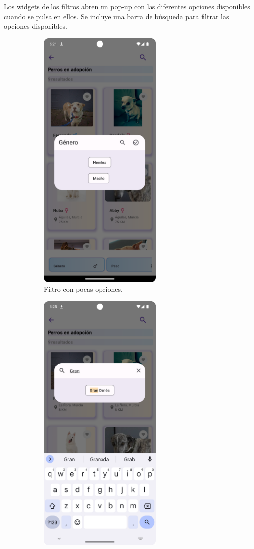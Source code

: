 \documentclass[a4paper, 12pt]{article}
\begin{document}
Los widgets de los filtros abren un pop-up con las diferentes opciones disponibles cuando se pulsa en ellos. Se incluye una barra de búsqueda para filtrar las opciones disponibles.


\begin{figure}[H]
   	\begin{subfigure}{0.48\textwidth}
		\begin{center}
			{\includegraphics[width=6cm]{app/FiltersDialog.png}\par}
			\caption{Filtro con pocas opciones.}
		\end{center}  
	\end{subfigure}\hfill
   	\begin{subfigure}{0.48\textwidth}
		\begin{center}
			{\includegraphics[width=6cm]{app/FilterSearch.png}\par}

\end{center}
\end{subfigure}
\end{figure}
\end{document}
